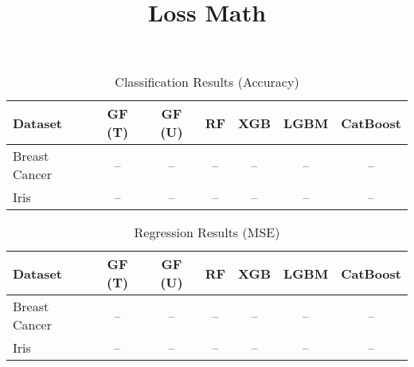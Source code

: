 \documentclass{article}
\begin{document}
\title{Loss Math}
\author{}
\date{}

\maketitle

\begin{table}[ht]
    \centering
    \caption{Classification Results (Accuracy)}
    \begin{tabular}{lcccccc}
    \hline
    Dataset & GF (T) & GF (U) & RF & XGB & LGBM & CatBoost \\
    \hline
    Breast Cancer & -- & -- & -- & -- & -- & -- \\
    Iris          & -- & -- & -- & -- & -- & -- \\
    \hline
    \end{tabular}
    \label{tab:classification_results}
    \end{table}

\begin{table}[ht]
    \centering
    \caption{Regression Results (MSE)}
    \begin{tabular}{lcccccc}
    \hline
    Dataset & GF (T) & GF (U) & RF & XGB & LGBM & CatBoost \\
    \hline
    Breast Cancer & -- & -- & -- & -- & -- & -- \\
    Iris          & -- & -- & -- & -- & -- & -- \\
    \hline
    \end{tabular}
    \label{tab:regression_results}
    \end{table}
\end{document}
